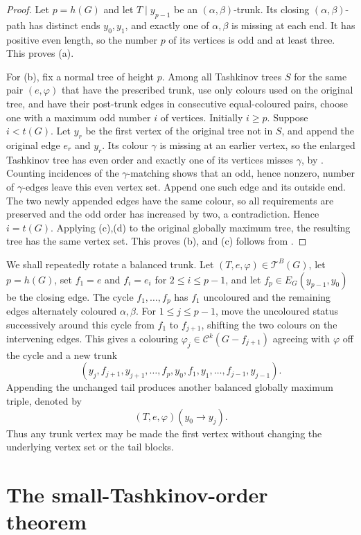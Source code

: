 \documentclass[11pt]{article}
\theoremstyle{definition}
\newcommand{\Ccal}{\mathcal C}
\newcommand{\Tcal}{\mathcal T}
\begin{document}
\begin{proof}
Let $p=h(G)$ and let $T\mathbin{|}y_{p-1}$ be an
$(\alpha,\beta)$-trunk. Its closing $(\alpha,\beta)$-path has distinct ends
$y_0,y_1$, and exactly one of $\alpha,\beta$ is missing at each end. It has
positive even length, so the number $p$ of its vertices is odd and at least
three. This proves (a).

For (b), fix a normal tree of height $p$. Among all Tashkinov trees $S$ for
the same pair $(e,\varphi)$ that have the prescribed trunk, use only colours
used on the original tree, and have their post-trunk edges in consecutive
equal-coloured pairs, choose one with a maximum odd number $i$ of vertices.
Initially $i\ge p$. Suppose $i<t(G)$. Let $y_r$ be the first vertex of the
original tree not in $S$, and append the original edge $e_r$ and $y_r$.
Its colour $\gamma$ is missing at an earlier vertex, so the enlarged
Tashkinov tree has even order and exactly one of its vertices misses
$\gamma$, by . Counting incidences of the
$\gamma$-matching shows that an odd, hence nonzero, number of
$\gamma$-edges leave this even vertex set. Append one such edge and its
outside end. The two newly appended edges have the same colour, so all
requirements are preserved and the odd order has increased by two, a
contradiction. Hence $i=t(G)$. Applying
(c),(d) to the original globally maximum tree, the
resulting tree has the same vertex set. This proves (b), and (c) follows
from .
\end{proof}

We shall repeatedly rotate a balanced trunk. Let
$(T,e,\varphi)\in\Tcal^B(G)$, let $p=h(G)$, set $f_1=e$ and
$f_i=e_i$ for $2\le i\le p-1$, and let
$f_p\in E_G(y_{p-1},y_0)$ be the closing edge. The cycle
$f_1,\ldots,f_p$ has $f_1$ uncoloured and the remaining edges alternately
coloured $\alpha,\beta$. For $1\le j\le p-1$, move the uncoloured status
successively around this cycle from $f_1$ to $f_{j+1}$, shifting the two
colours on the intervening edges. This gives a colouring
$\varphi_j\in\Ccal^k(G-f_{j+1})$ agreeing with $\varphi$ off the cycle and a
new trunk
\[
 (y_j,f_{j+1},y_{j+1},\ldots,f_p,y_0,
   f_1,y_1,\ldots,f_{j-1},y_{j-1}).
\]
Appending the unchanged tail produces another balanced globally maximum
triple, denoted by
\[
 (T,e,\varphi)(y_0\to y_j).
\]
Thus any trunk vertex may be made the first vertex without changing the
underlying vertex set or the tail blocks.


\section{The small-Tashkinov-order theorem}
\end{document}
